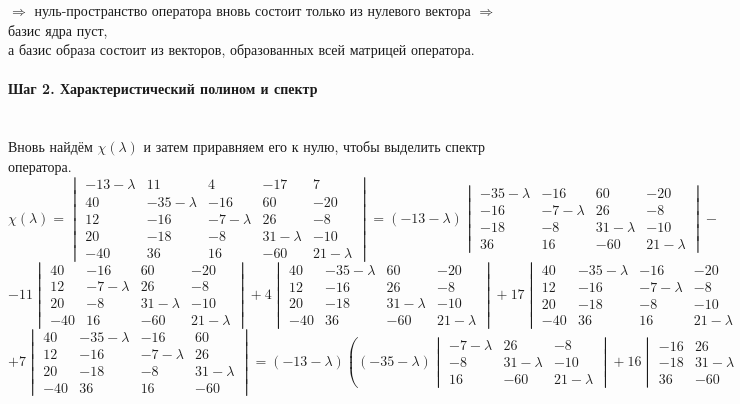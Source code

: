 \documentclass{article}
\newcommand{\la}{\lambda}
\begin{document}
\begin{center}
$\Rightarrow$ нуль-пространство оператора вновь состоит только из нулевого вектора $\Rightarrow$ базис ядра пуст, \\а базис образа состоит из векторов, образованных всей матрицей оператора.
\end{center}
\paragraph*{Шаг 2. Характеристический полином и спектр} \, \\
Вновь найдём $\chi(\la)$ и затем приравняем его к нулю, чтобы выделить спектр оператора.
$$\chi(\la) = \begin{vmatrix}
-13-\la & 11 & 4 & -17 & 7 \\
40 & -35-\la & -16 & 60 & -20 \\
12 & -16 & -7-\la & 26 & -8 \\
20 & -18 & -8 & 31-\la & -10 \\
-40 & 36 & 16 & -60 & 21-\la
\end{vmatrix} = (-13-\la)\begin{vmatrix}
-35-\la & -16 & 60 & -20 \\
-16 & -7-\la & 26 & -8 \\
-18 & -8 & 31-\la & -10 \\
36 & 16 & -60 & 21-\la
\end{vmatrix}-$$
$$-11\begin{vmatrix}
40 & -16 & 60 & -20 \\
12 & -7-\la & 26 & -8 \\
20 & -8 & 31-\la & -10 \\
-40 & 16 & -60 & 21-\la
\end{vmatrix}+4\begin{vmatrix}
40 & -35-\la & 60 & -20 \\
12 & -16 & 26 & -8 \\
20 & -18 & 31-\la & -10 \\
-40 & 36 & -60 & 21-\la
\end{vmatrix}+17\begin{vmatrix}
40 & -35-\la & -16 & -20 \\
12 & -16 & -7-\la & -8 \\
20 & -18 & -8 & -10 \\
-40 & 36 & 16 & 21-\la
\end{vmatrix} + $$
$$+ 7\begin{vmatrix}
40 & -35-\la & -16 & 60 \\
12 & -16 & -7-\la & 26 \\
20 & -18 & -8 & 31-\la \\
-40 & 36 & 16 & -60 
\end{vmatrix} = (-13-\lambda)\left((-35-\lambda)\begin{vmatrix}
-7-\la & 26 & -8 \\
-8 & 31-\la & -10 \\
16 & -60 & 21-\la
\end{vmatrix}+16\begin{vmatrix}
-16 & 26 & -8 \\
-18 & 31-\la & -10 \\
36 & -60 & 21-\la
\end{vmatrix}+\right.$$
\end{document}
